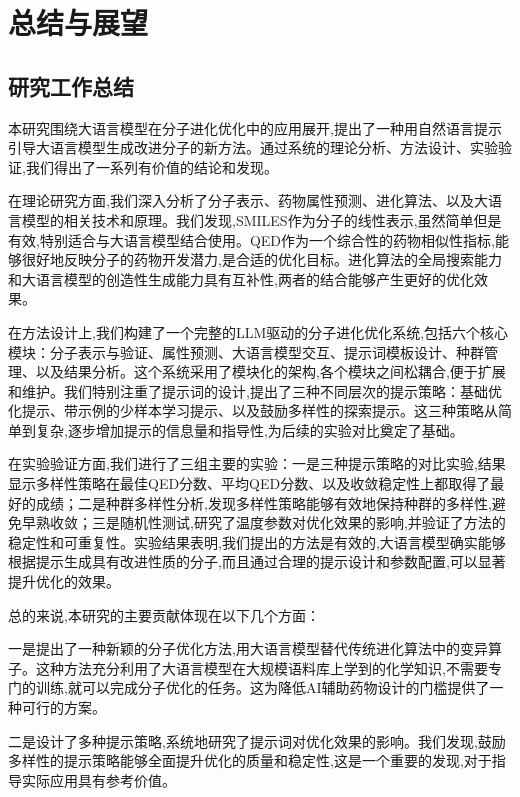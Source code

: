 \chapter{总结与展望}
\vspace{7pt}


\section{研究工作总结}

本研究围绕大语言模型在分子进化优化中的应用展开,提出了一种用自然语言提示引导大语言模型生成改进分子的新方法。通过系统的理论分析、方法设计、实验验证,我们得出了一系列有价值的结论和发现。

在理论研究方面,我们深入分析了分子表示、药物属性预测、进化算法、以及大语言模型的相关技术和原理。我们发现,SMILES作为分子的线性表示,虽然简单但是有效,特别适合与大语言模型结合使用。QED作为一个综合性的药物相似性指标,能够很好地反映分子的药物开发潜力,是合适的优化目标。进化算法的全局搜索能力和大语言模型的创造性生成能力具有互补性,两者的结合能够产生更好的优化效果。

在方法设计上,我们构建了一个完整的LLM驱动的分子进化优化系统,包括六个核心模块：分子表示与验证、属性预测、大语言模型交互、提示词模板设计、种群管理、以及结果分析。这个系统采用了模块化的架构,各个模块之间松耦合,便于扩展和维护。我们特别注重了提示词的设计,提出了三种不同层次的提示策略：基础优化提示、带示例的少样本学习提示、以及鼓励多样性的探索提示。这三种策略从简单到复杂,逐步增加提示的信息量和指导性,为后续的实验对比奠定了基础。

在实验验证方面,我们进行了三组主要的实验：一是三种提示策略的对比实验,结果显示多样性策略在最佳QED分数、平均QED分数、以及收敛稳定性上都取得了最好的成绩；二是种群多样性分析,发现多样性策略能够有效地保持种群的多样性,避免早熟收敛；三是随机性测试,研究了温度参数对优化效果的影响,并验证了方法的稳定性和可重复性。实验结果表明,我们提出的方法是有效的,大语言模型确实能够根据提示生成具有改进性质的分子,而且通过合理的提示设计和参数配置,可以显著提升优化的效果。

总的来说,本研究的主要贡献体现在以下几个方面：

一是提出了一种新颖的分子优化方法,用大语言模型替代传统进化算法中的变异算子。这种方法充分利用了大语言模型在大规模语料库上学到的化学知识,不需要专门的训练,就可以完成分子优化的任务。这为降低AI辅助药物设计的门槛提供了一种可行的方案。

二是设计了多种提示策略,系统地研究了提示词对优化效果的影响。我们发现,鼓励多样性的提示策略能够全面提升优化的质量和稳定性,这是一个重要的发现,对于指导实际应用具有参考价值。

